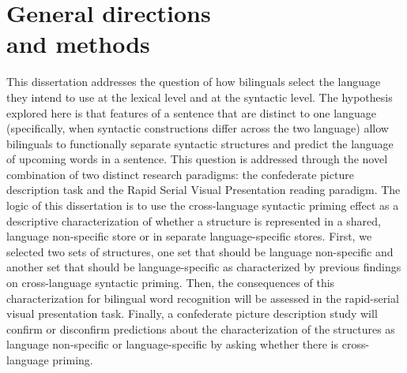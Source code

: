 \chapter{General directions\\ and methods}
\label{generaldirectionsandmethodologies}

This dissertation addresses the question of how bilinguals select the language they intend to use at the lexical level and at the syntactic level. The hypothesis explored here is that features of a sentence that are distinct to one language (specifically, when syntactic constructions differ across the two language) allow bilinguals to functionally separate syntactic structures and predict the language of upcoming words in a sentence. This question is addressed through the novel combination of two distinct research paradigms: the confederate picture description task and the Rapid Serial Visual Presentation reading paradigm. The logic of this dissertation is to use the cross-language syntactic priming effect as a descriptive characterization of whether a structure is represented in a shared, language non-specific store or in separate language-specific stores. First, we selected two sets of structures, one set that should be language non-specific and another set that should be language-specific as characterized by previous findings on cross-language syntactic priming. Then, the consequences of this characterization for bilingual word recognition will be assessed in the rapid-serial visual presentation task. Finally, a confederate picture description study will confirm or disconfirm predictions about the characterization of the structures as language non-specific or language-specific by asking whether there is cross-language priming.

